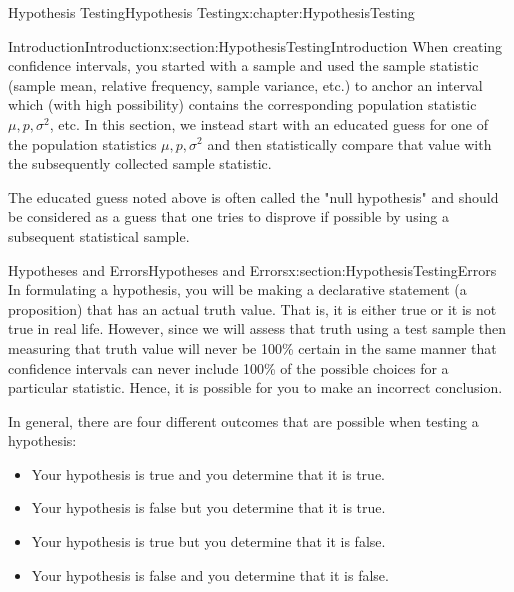 \documentclass[oneside,10pt,]{book}
\numberwithin{equation}{section}
\begin{document}
\begin{chapterptx}{Hypothesis Testing}{}{Hypothesis Testing}{}{}{x:chapter:HypothesisTesting}
%
%
\typeout{************************************************}
\typeout{************************************************}
%
\begin{sectionptx}{Introduction}{}{Introduction}{}{}{x:section:HypothesisTestingIntroduction}
When creating confidence intervals, you started with a sample and used the sample statistic (sample mean, relative frequency, sample variance, etc.) to anchor an interval which (with high possibility) contains the corresponding population statistic \(\mu, p, \sigma^2\), etc. In this section, we instead start with an educated guess for one of the population statistics \(\mu, p, \sigma^2\) and then statistically compare that value with the subsequently collected sample statistic.%
\par
The educated guess noted above is often called the "null hypothesis" and should be considered as a guess that one tries to disprove if possible by using a subsequent statistical sample.%
\end{sectionptx}
%
%
\typeout{************************************************}
\typeout{************************************************}
%
\begin{sectionptx}{Hypotheses and Errors}{}{Hypotheses and Errors}{}{}{x:section:HypothesisTestingErrors}
In formulating a hypothesis, you will be making a declarative statement (a proposition) that has an actual truth value. That is, it is either true or it is not true in real life. However, since we will assess that truth using a test sample then measuring that truth value will never be 100\% certain in the same manner that confidence intervals can never include 100\% of the possible choices for a particular statistic. Hence, it is possible for you to make an incorrect conclusion.%
\par
In general, there are four different outcomes that are possible when testing a hypothesis:%
\begin{itemize}[label=\textbullet]
\item{}Your hypothesis is true and you determine that it is true.%
\item{}Your hypothesis is false but you determine that it is true.%
\item{}Your hypothesis is true but you determine that it is false.%
\item{}Your hypothesis is false and you determine that it is false.%

\end{itemize}
\end{sectionptx}
\end{chapterptx}
\end{document}
